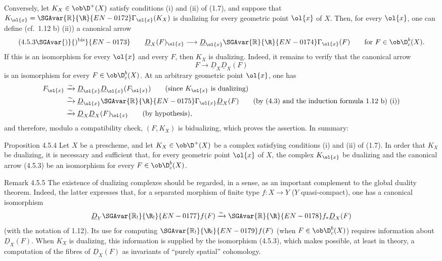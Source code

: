 Conversely, let $K_X\in\ob\D^+(X)$ satisfy conditions (i) and (ii) of (1.7), and suppose that $K_{\ol{x}}=\SGAvar{\mathbb{R}}{\R}{EN-0172}\Gamma_{\ol{x}}(K_X)$ is dualizing for every geometric point $\ol{x}$ of $X$. Then, for every $\ol{x}$, one can define (cf.~1.12 b) (ii)) a canonical arrow
\[
(4.5.3\SGAvar{)}{)^{\mathrm{bis}}}{EN-0173}\qquad \underline{D}_X(F)_{\ol{x}}\longrightarrow \underline{D}_{\ol{x}}\SGAvar{\mathbb{R}}{\R}{EN-0174}\Gamma_{\ol{x}}(F)\qquad \text{for } F\in\ob\D_c^b(X).
\]
If this is an isomorphism for every $\ol{x}$ and every $F$, then $K_X$ is dualizing. Indeed, it remains to verify that the canonical arrow
\[
F\longrightarrow \underline{D}_X\underline{D}_X(F)
\]
is an isomorphism for every $F\in\ob\D_c^b(X)$. At an arbitrary geometric point $\ol{x}$, one has
\[
\begin{aligned}
F_{\ol{x}}&\xrightarrow{\sim}\underline{D}_{\ol{x}}\underline{D}_{\ol{x}}(F_{\ol{x}})\qquad\text{(since $K_{\ol{x}}$ is dualizing)}\\
&\xrightarrow{\sim}\underline{D}_{\ol{x}}\SGAvar{\mathbb{R}}{\R}{EN-0175}\Gamma_{\ol{x}}\underline{D}_X(F)\qquad\text{(by (4.3) and the induction formula 1.12 b) (i))}\\
&\xrightarrow{\sim}\underline{D}_X\underline{D}_X(F)_{\ol{x}}\qquad\text{(by hypothesis)},
\end{aligned}
\]
and therefore, modulo a compatibility check, $(F,K_X)$ is bidualizing, which proves the assertion. In summary:

\begin{statement}{Proposition 4.5.4}
Let $X$ be a prescheme, and let $K_X\in\ob\D^+(X)$ be a complex satisfying conditions (i) and (ii) of (1.7). In order that $K_X$ be dualizing, it is necessary and sufficient that, for every geometric point $\ol{x}$ of $X$, the complex $K_{\ol{x}}$ be dualizing and the canonical arrow (4.5.3) be an isomorphism for every $F\in\ob\D_c^b(X)$.
\end{statement}

\begin{statement}{Remark 4.5.5}
The existence of dualizing complexes should be regarded, in a sense, as an important complement to the global duality theorem. Indeed, the latter expresses that, for a separated morphism of finite type $f:X\to Y$ ($Y$ quasi-compact), one has a canonical isomorphism
\[
\underline{D}_Y\SGAvar{\mathbb{R}_!}{\R_!}{EN-0177}f(F)\xrightarrow{\sim}\SGAvar{\mathbb{R}}{\R}{EN-0178} f_*\underline{D}_X(F)
\]
(with the notation of 1.12). Its use for computing $\SGAvar{\mathbb{R}_!}{\R_!}{EN-0179}f(F)$ (when $F\in\ob\D_c^b(X)$) requires information about $\underline{D}_X(F)$. When $K_X$ is dualizing, this information is supplied by the isomorphism (4.5.3), which makes possible, at least in theory, a computation of the fibres of $\underline{D}_X(F)$ as invariants of ``purely spatial'' cohomology.
\end{statement}

